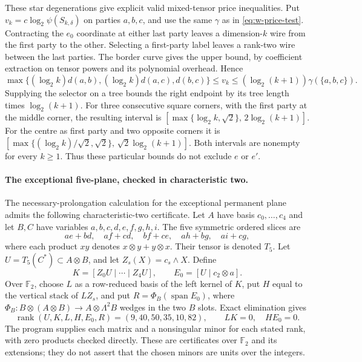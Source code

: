 These star degenerations give explicit valid mixed-tensor price inequalities. Put $v_k=c\log_2\psi(S_{k,\delta})$ on parties $a,b,c$, and use the same $\gamma$ as in \eqref{eq:w-price-test}. Contracting the $e_0$ coordinate at either last party leaves a dimension-$k$ wire from the first party to the other. Selecting a first-party label leaves a rank-two wire between the last parties. The border curve gives the upper bound, by coefficient extraction on tensor powers and its polynomial overhead. Hence
\begin{equation}\label{eq:star-price-test}
 \max\{(\log_2 k)d(a,b),(\log_2 k)d(a,c),d(b,c)\}
 \leq v_k\leq(\log_2(k+1))\gamma(\{a,b,c\}).
\end{equation}
Supplying the selector on a tree bounds the right endpoint by its tree length times $\log_2(k+1)$. For three consecutive square corners, with the first party at the middle corner, the resulting interval is
$[\max\{\log_2 k,\sqrt2\},\,2\log_2(k+1)]$.
For the centre as first party and two opposite corners it is
$[\max\{(\log_2 k)/\sqrt2,\sqrt2\},\,\sqrt2\log_2(k+1)]$.
Both intervals are nonempty for every $k\geq1$. Thus these particular bounds do not exclude $e$ or $e'$.

\paragraph{The exceptional five-plane, checked in characteristic two.}
The necessary-prolongation calculation for the exceptional permanent plane \cite[section ``A characteristic-free obstruction for the exceptional permanent plane'']{SuppliedPencils2026} admits the following characteristic-two certificate. Let $A$ have basis $c_0,\ldots,c_4$ and let $B,C$ have variables $a,b,c,d,e,f,g,h,i$. The five symmetric ordered slices are
\[
 ae+bd,\quad af+cd,\quad bf+ce,\quad ah+bg,\quad ai+cg,
\]
where each product $xy$ denotes $x\otimes y+y\otimes x$. Their tensor is denoted $T_5$. Let $U=T_5(C^*)\subset A\otimes B$, and let $Z_s(X)=c_s\wedge X$. Define
\[
 K=[Z_0U\mid\cdots\mid Z_4U],\qquad
 E_0=[U\mid c_2\otimes a].
\]
Over $\mathbb F_2$, choose $L$ as a row-reduced basis of the left kernel of $K$, put $H$ equal to the vertical stack of $LZ_s$, and put $R=\Phi_B(\operatorname{span}E_0)$, where
$\Phi_B:B\otimes(A\otimes B)\to A\otimes\Lambda^2B$ wedges in the two $B$ slots. Exact elimination gives
\[
 \operatorname{rank}(U,K,L,H,E_0,R)=(9,40,50,35,10,82),
 \qquad LK=0,\quad HE_0=0.
\]
The program supplies each matrix and a nonsingular minor for each stated rank, with zero products checked directly. These are certificates over $\mathbb F_2$ and its extensions; they do not assert that the chosen minors are units over the integers.

